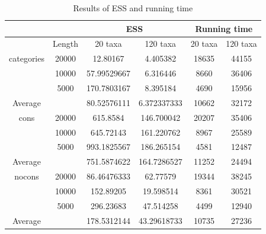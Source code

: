 \documentclass{bmcart}
\begin{document}
\begin{backmatter}
\begin{table}[h!]
  \centering
\begin{tabular}{cc|cc|cc}
\hline
&&\multicolumn{2}{c|}{ESS}&\multicolumn{2}{c}{Running time}\\
\hline
&Length&20 taxa&120 taxa&20 taxa&120 taxa\\
categories&20000&12.80167&4.405382&18635&44155\\
&10000&57.99529667&6.316446&8660&36406\\
&5000&170.7803167&8.395184&4690&15956\\
Average&&80.52576111&6.372337333&10662&32172\\
\hline
cons&20000&615.8584&146.700042&20207&35406\\
&10000&645.72143&161.220762&8967&25589\\
&5000&993.1825567&186.265154&4581&12487\\
Average&&751.5874622&164.7286527&11252&24494\\
\hline
nocons&20000&86.46476333&62.77579&19344&38245\\
&10000&152.89205&19.598514&8361&30521\\
&5000&296.23683&47.514258&4499&12940\\
Average&&178.5312144&43.29618733&10735&27236\\
\hline
\end{tabular}
\caption{Results of ESS and running time}\label{num_hpd}
\end{table}

%


\end{backmatter}
\end{document}
